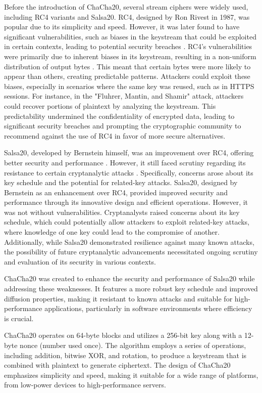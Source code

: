 \documentclass[a4paper,12pt]{report}
\begin{document}
Before the introduction of ChaCha20, several stream ciphers were widely used, including RC4 variants \cite{paul2011rc4} and Salsa20.
RC4, designed by Ron Rivest in 1987, was popular due to its simplicity and speed.
However, it was later found to have significant vulnerabilities, such as biases in the keystream that could be exploited in certain contexts, leading to potential security breaches \cite{klein2008attacks}.
RC4's vulnerabilities were primarily due to inherent biases in its keystream, resulting in a non-uniform distribution of output bytes \cite{fluhrer2001weaknesses}.
This meant that certain bytes were more likely to appear than others, creating predictable patterns.
Attackers could exploit these biases, especially in scenarios where the same key was reused, such as in HTTPS sessions.
For instance, in the "Fluhrer, Mantin, and Shamir" attack, attackers could recover portions of plaintext by analyzing the keystream.
This predictability undermined the confidentiality of encrypted data, leading to significant security breaches and prompting the cryptographic community to recommend against the use of RC4 in favor of more secure alternatives.

Salsa20, developed by Bernstein himself, was an improvement over RC4, offering better security and performance \cite{bernstein2005salsa20}.
However, it still faced scrutiny regarding its resistance to certain cryptanalytic attacks \cite{tsunoo2007differential}.
Specifically, concerns arose about its key schedule and the potential for related-key attacks.
Salsa20, designed by Bernstein as an enhancement over RC4, provided improved security and performance through its innovative design and efficient operations. However, it was not without vulnerabilities. Cryptanalysts raised concerns about its key schedule, which could potentially allow attackers to exploit related-key attacks, where knowledge of one key could lead to the compromise of another. Additionally, while Salsa20 demonstrated resilience against many known attacks, the possibility of future cryptanalytic advancements necessitated ongoing scrutiny and evaluation of its security in various contexts.

ChaCha20 was created to enhance the security and performance of Salsa20 while addressing these weaknesses.
It features a more robust key schedule and improved diffusion properties, making it resistant to known attacks and suitable for high-performance applications, particularly in software environments where efficiency is crucial.

ChaCha20 operates on 64-byte blocks and utilizes a 256-bit key along with a 12-byte nonce (number used once).
The algorithm employs a series of operations, including addition, bitwise XOR, and rotation, to produce a keystream that is combined with plaintext to generate ciphertext.
The design of ChaCha20 emphasizes simplicity and speed, making it suitable for a wide range of platforms, from low-power devices to high-performance servers.
\end{document}
